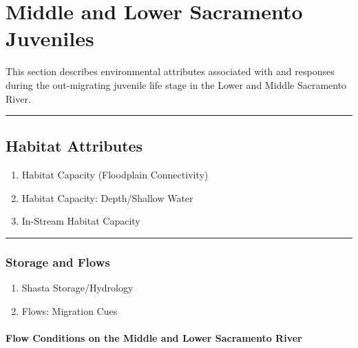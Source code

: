 \documentclass[
]{book}
\theoremstyle{definition}
\theoremstyle{definition}
\theoremstyle{definition}
\theoremstyle{definition}
\theoremstyle{remark}
\begin{document}
\hypertarget{middle-and-lower-sacramento-juveniles}{%
\chapter{Middle and Lower Sacramento Juveniles}\label{middle-and-lower-sacramento-juveniles}}

This section describes environmental attributes associated with and responses during the out-migrating juvenile life stage in the Lower and Middle Sacramento River.

\begin{center}\rule{0.5\linewidth}{0.5pt}\end{center}

\hypertarget{habitat-attributes-2}{%
\section{Habitat Attributes}\label{habitat-attributes-2}}

\begin{enumerate}
\def\labelenumi{\arabic{enumi}.}
\item
  Habitat Capacity (Floodplain Connectivity)
\item
  Habitat Capacity: Depth/Shallow Water
\item
  In-Stream Habitat Capacity
\end{enumerate}

\begin{center}\rule{0.5\linewidth}{0.5pt}\end{center}

\hypertarget{storage-and-flows}{%
\subsection{Storage and Flows}\label{storage-and-flows}}

\begin{enumerate}
\def\labelenumi{\arabic{enumi}.}
\item
  Shasta Storage/Hydrology
\item
  Flows: Migration Cues
\end{enumerate}

\hypertarget{flow-conditions-on-the-middle-and-lower-sacramento-river}{%
\subsubsection{Flow Conditions on the Middle and Lower Sacramento River}\label{flow-conditions-on-the-middle-and-lower-sacramento-river}}
\end{document}

